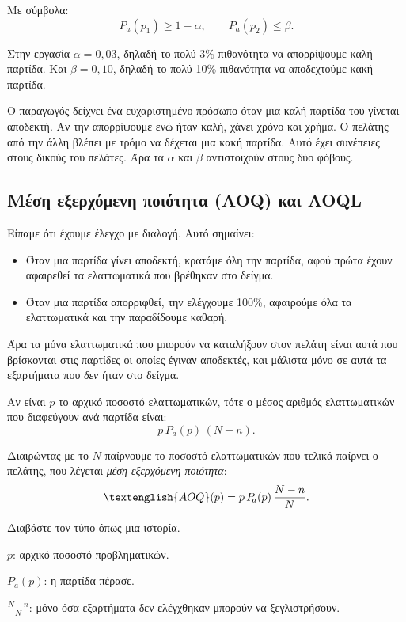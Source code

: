 \documentclass[12pt,a4paper]{article}
\newcommand{\Pa}{P_{\!a}}
\newcommand{\AOQ}{\textenglish{AOQ}}
\begin{document}
Με σύμβολα:
\[
    \Pa(p_1)\ge 1-\alpha,\qquad \Pa(p_2)\le \beta.
\]

Στην εργασία \(\alpha=0{,}03\), δηλαδή το πολύ 3\% πιθανότητα να απορρίψουμε
καλή παρτίδα. Και \(\beta=0{,}10\), δηλαδή το πολύ 10\% πιθανότητα να
αποδεχτούμε κακή παρτίδα.

\begin{intuition}
Ο παραγωγός δείχνει ένα ευχαριστημένο πρόσωπο όταν μια καλή παρτίδα του
γίνεται αποδεκτή. Αν την απορρίψουμε ενώ ήταν καλή, χάνει χρόνο και χρήμα.
Ο πελάτης από την άλλη βλέπει με τρόμο να δέχεται μια κακή παρτίδα. Αυτό
έχει συνέπειες στους δικούς του πελάτες. Άρα τα \(\alpha\) και \(\beta\)
αντιστοιχούν στους δύο φόβους.
\end{intuition}

\subsection{Μέση εξερχόμενη ποιότητα (AOQ) και AOQL}

Είπαμε ότι έχουμε έλεγχο με διαλογή. Αυτό σημαίνει:

\begin{itemize}[leftmargin=2.2em]
    \item Όταν μια παρτίδα γίνει αποδεκτή, κρατάμε όλη την παρτίδα, αφού πρώτα
    έχουν αφαιρεθεί τα ελαττωματικά που βρέθηκαν στο δείγμα.
    \item Όταν μια παρτίδα απορριφθεί, την ελέγχουμε 100\%, αφαιρούμε όλα τα
    ελαττωματικά και την παραδίδουμε καθαρή.
\end{itemize}

Άρα τα μόνα ελαττωματικά που μπορούν να καταλήξουν στον πελάτη είναι αυτά που
βρίσκονται στις παρτίδες οι οποίες έγιναν αποδεκτές, και μάλιστα μόνο σε
αυτά τα εξαρτήματα που \emph{δεν} ήταν στο δείγμα.

Αν είναι \(p\) το αρχικό ποσοστό ελαττωματικών, τότε ο μέσος αριθμός
ελαττωματικών που διαφεύγουν ανά παρτίδα είναι:
\[
    p\,\Pa(p)\,(N-n).
\]

Διαιρώντας με το \(N\) παίρνουμε το ποσοστό ελαττωματικών που τελικά παίρνει
ο πελάτης, που λέγεται \emph{μέση εξερχόμενη ποιότητα}:
\[
    \AOQ(p)=p\,\Pa(p)\,\frac{N-n}{N}.
\]

\begin{intuition}
Διαβάστε τον τύπο όπως μια ιστορία.

\(p\): αρχικό ποσοστό προβληματικών.

\(\Pa(p)\): η παρτίδα πέρασε.

\(\frac{N-n}{N}\): μόνο όσα εξαρτήματα δεν ελέγχθηκαν μπορούν να ξεγλιστρήσουν.
\end{intuition}
\end{document}
